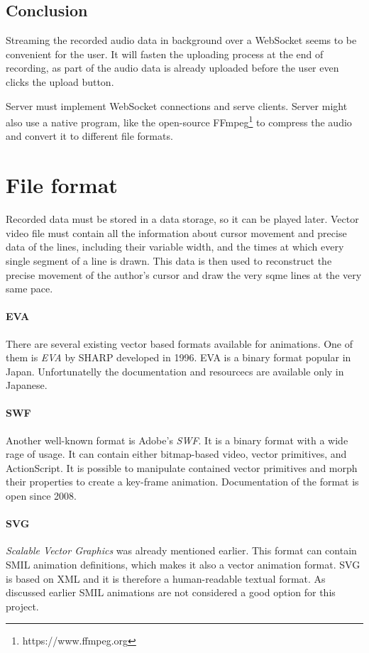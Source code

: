 \subsection{Conclusion}
Streaming the recorded audio data in background over a WebSocket seems to be convenient for the user. It will fasten the uploading process at the end of recording, as part of the audio data is already uploaded before the user even clicks the upload button.

Server must implement WebSocket connections and serve clients. Server might also use a native program, like the open-source FFmpeg\footnote{https://www.ffmpeg.org} to compress the audio and convert it to different file formats.

\section{File format}
Recorded data must be stored in a data storage, so it can be played later. Vector video file must contain all the information about cursor movement and precise data of the lines, including their variable width, and the times at which every single segment of a line is drawn. This data is then used to reconstruct the precise movement of the author's cursor and draw the very sqme lines at the very same pace.

\paragraph{EVA} There are several existing vector based formats available for animations. One of them is \textit{EVA} by SHARP\cite{eva_sharp} developed in 1996. EVA is a binary format popular in Japan. Unfortunatelly the documentation and resourcecs are available only in Japanese\cite{eva_wikipedia}.

\paragraph{SWF} Another well-known format is Adobe's \textit{SWF}. It is a binary format with a wide rage of usage. It can contain either bitmap-based video, vector primitives, and ActionScript\cite{swf_wiki}. It is possible to manipulate contained vector primitives and morph their properties to create a key-frame animation\cite{swf_doc}. Documentation of the format is open since 2008.

\paragraph{SVG} \textit{Scalable Vector Graphics} was already mentioned earlier. This format can contain SMIL animation definitions, which makes it also a vector animation format. SVG is based on XML and it is therefore a human-readable textual format. As discussed earlier SMIL animations are not considered a good option for this project.

